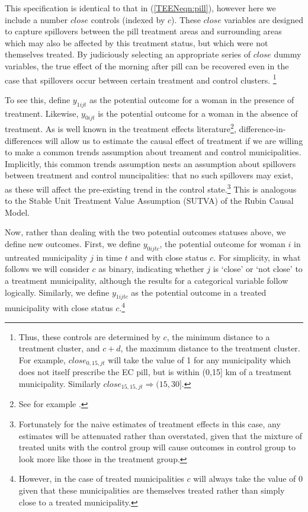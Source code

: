 This specification is identical to that in (\ref{TEENeqn:pill}), however here we 
include a number $close$ controls (indexed by $c$).  These $close$ variables are 
designed to capture spillovers between the pill treatment areas and surrounding 
areas which may also be affected by this treatment status, but which were not 
themselves treated.  By judiciously selecting an appropriate series of $close$ 
dummy variables, the true effect of the morning after pill can be recovered even
in the case that spillovers occur between certain treatment and control clusters.%
\footnote{Thus, these controls are determined by $c$, the minimum distance to
a treatment cluster, and $c+d$, the maximum distance to the treatment cluster.
For example, $close_{0,15,jt}$ will take the value of 1 for any municipality
which does not itself prescribe the EC pill, but is within (0,15] km of a 
treatment municipality.  Similarly $close_{15,15,jt}\Rightarrow (15,30]$.}

To see this, define $y_{1ijt}$ as the potential outcome for a woman in the 
presence of treatment.  Likewise, $y_{0ijt}$ is the potential outcome for a 
woman in the absence of treatment.  As is well known in the treatment effects
literature\footnote{See for example \citet{CardKruger1994}.}, difference-in-%
differences will allow us to estimate the causal effect of treatment if we are 
willing to make a common trends assumption about treament and control 
municipalities.  Implicitly, this common trends assumption nests an assumption
about spillovers between treatment and control muncipalities: that no such 
spillovers may exist, as these will affect the pre-existing trend in the control 
state.\footnote{Fortunately for the naive estimates of treatment effects in this 
case, any estimates will be attenuated rather than overstated, given that the 
mixture of treated units with the control group will cause outcomes in control 
group to look more like those in the treatment group.}  This is analogous to the 
Stable Unit Treatment Value Assumption (SUTVA) of the Rubin Causal Model.

Now, rather than dealing with the two potential outcomes statuses above, we
define new outcomes.  First, we define $y_{0ijtc}$, the potential outcome for 
woman $i$ in untreated municipality $j$ in time $t$ and with close status $c$.  
For simplicity, in what follows we will consider $c$ as binary, indicating whether
$j$ is `close' or `not close' to a treatment municipality, although the results
for a categorical variable follow logically.  Similarly, we define $y_{1ijtc}$
as the potential outcome in a treated municipality with close status 
$c$.\footnote{However, in the case of treated municipalities $c$ will always
take the value of 0 given that these municipalities are themselves treated rather
than simply close to a treated municipality.}

